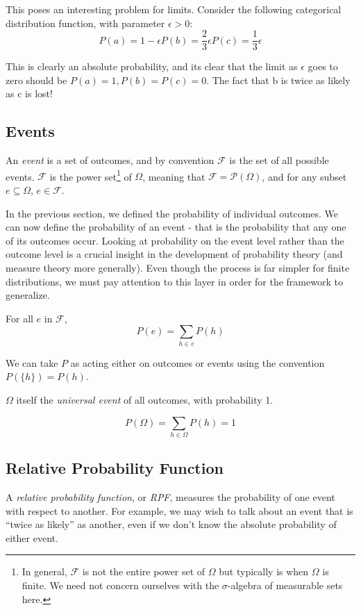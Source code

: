 \documentclass[twoside]{article}
\newcommand{\quotes}[1]{``#1''}
\theoremstyle{plain}%
\theoremstyle{definition}
\theoremstyle{remark}
\begin{document}
This poses an interesting problem for limits. Consider the following categorical distribution function, with parameter \(\epsilon > 0\):
\[
P(a) = 1 - \epsilon
P(b) = \frac{2}{3}\epsilon
P(c) = \frac{1}{3}\epsilon
\]

This is clearly an absolute probability, and its clear that the limit as \(\epsilon\) goes to zero should be \(P(a) = 1, P(b) = P(c) = 0\). The fact that b is twice as likely as c is lost!

\subsection{Events}

An \textit{event} is a set of outcomes, and by convention \(\mathcal{F}\) is the set of all possible events. \(\mathcal{F}\) is the power set\footnote{In general, \(\mathcal{F}\) is not the entire power set of \(\Omega\) but typically is when \(\Omega\) is finite. We need not concern ourselves with the \(\sigma\)-algebra of measurable sets here.} of \(\Omega\), meaning that \(\mathcal{F} = \mathcal{P}(\Omega)\), and for any subset \(e \subseteq \Omega\), \(e \in \mathcal{F}\).

In the previous section, we defined the probability of individual outcomes. We can now define the probability of an event - that is the probability that any one of its outcomes occur.
Looking at probability on the event level rather than the outcome level is a crucial insight in the development of probability theory (and measure theory more generally). Even though the process is far simpler for finite distributions, we must pay attention to this layer in order for the framework to generalize.

For all \(e\) in \(\mathcal{F}\),
\[ P(e) = \sum_{h \in e}{P(h)}\]

We can take \(P\) as acting either on outcomes or events using the convention \(P(\{h\}) = P(h)\).

\(\Omega\) itself the \textit{universal event} of all outcomes, with probability 1.

\[P(\Omega) = \sum_{h \in \Omega}{P(h)} = 1\]

\subsection{Relative Probability Function}
\label{section:standard_relative_prob}

A \textit{relative probability function}, or \textit{RPF}, measures the probability of one event with respect to another. For example, we may wish to talk about an event that is \quotes{twice as likely} as another, even if we don't know the absolute probability of either event.
\end{document}
